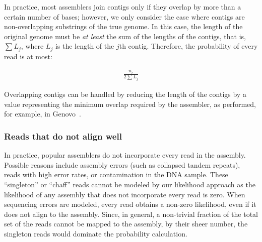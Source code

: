 In practice, most assemblers join contigs only if they overlap by more than a certain number of bases; however, we only consider the case where contigs are non-overlapping substrings of the true genome.
In this case, the length of the original genome must be \emph{at least} the
sum of the lengths of the contigs, that is, $\sum L_j$, where $L_j$ is the
length of the $j$th contig. Therefore, the probability of every read
is at most:

\begin{equation}
\begin{aligned}
  \frac{n_r}{2\sum L_j}
\end{aligned}
\end{equation}

Overlapping contigs can be handled by reducing the length of the contigs by a value representing the minimum overlap required by the assembler, as performed, for example, in Genovo~\cite{genovo2011}.



\subsubsection{Reads that do not align well}
\label{methods_practical_unassembled}
In practice, popular assemblers do not incorporate every read in the
assembly.  Possible reasons include assembly errors (such as collapsed
tandem repeats), reads with high error rates, or contamination in the
DNA sample. These ``singleton'' or ``chaff'' reads cannot be modeled
by our likelihood approach as the likelihood of any assembly that
does not incorporate every read is zero.
When sequencing errors are modeled, every read obtains a non-zero likelihood, even if it does not align to the assembly. Since, in general, a non-trivial fraction of the total set of the reads cannot be mapped to the assembly, by their sheer number, the singleton reads would dominate the probability calculation.

